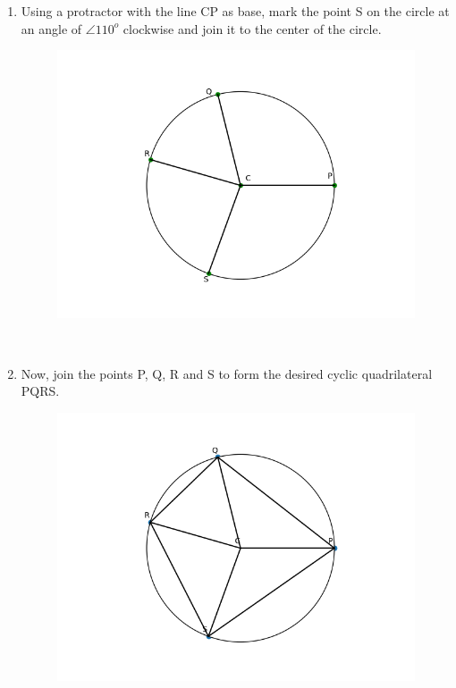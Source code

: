 \documentclass[journal,12pt,twocolumn]{IEEEtran}
\begin{document}
\begin{enumerate}
\item Using a protractor with the line CP as base, mark the point S on the circle at an angle of $\angle 110^o$ clockwise and join it to the center of the circle.
\begin{figure}[ht]
    \centering
    \includegraphics[scale = 0.5]{figs/cnstrct_fig4.png}
\end{figure}\\
\item Now, join the points P, Q, R and S to form the desired cyclic quadrilateral PQRS.
\begin{figure}[ht]
    \centering
    \includegraphics[scale = 0.5]{figs/cnstrct_fig5.png}
\end{figure}
\end{enumerate}
\end{document}
